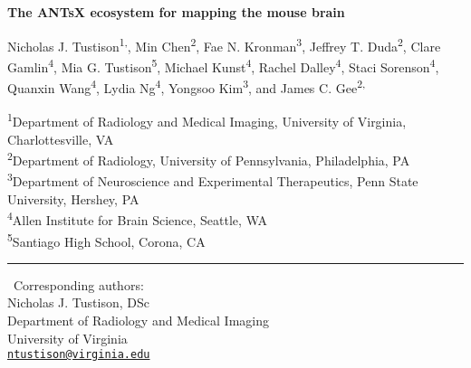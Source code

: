 \documentclass[
  12pt,
]{article}
\author{}
\date{\vspace{-2.5em}}
\begin{document}
\linenumbers
{}


\begin{centering}

$ $

\vspace{6cm}

\LARGE

{\bf The ANTsX ecosystem for mapping the mouse brain}

\vspace{1.0 cm}

\normalsize

Nicholas J. Tustison\textsuperscript{1,\textrm{\Letter}},
Min Chen\textsuperscript{2},
Fae N. Kronman\textsuperscript{3},
Jeffrey T. Duda\textsuperscript{2},
Clare Gamlin\textsuperscript{4},
Mia G. Tustison\textsuperscript{5},
Michael Kunst\textsuperscript{4},
Rachel Dalley\textsuperscript{4},
Staci Sorenson\textsuperscript{4},
Quanxin Wang\textsuperscript{4},
Lydia Ng\textsuperscript{4},
Yongsoo Kim\textsuperscript{3}, and
James C. Gee\textsuperscript{2,\textrm{\Letter}}

\small

\textsuperscript{1}Department of Radiology and Medical Imaging, University of Virginia, Charlottesville, VA \\
\textsuperscript{2}Department of Radiology, University of Pennsylvania, Philadelphia, PA \\
\textsuperscript{3}Department of Neuroscience and Experimental Therapeutics, Penn State University, Hershey, PA \\
\textsuperscript{4}Allen Institute for Brain Science, Seattle, WA \\
\textsuperscript{5}Santiago High School, Corona, CA \\

\end{centering}

\vspace{3.5 cm}

\noindent

\rule{4cm}{0.4pt}

\scriptsize

\Letter\(\,\) Corresponding authors:\\

Nicholas J. Tustison, DSc\\
Department of Radiology and Medical Imaging\\
University of Virginia\\
\href{mailto:ntustison@virginia.edu}{\nolinkurl{ntustison@virginia.edu}}\\
\end{document}
